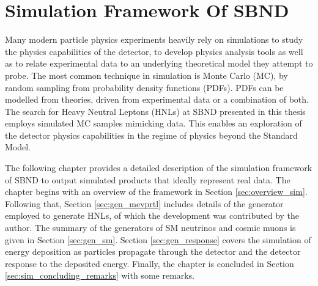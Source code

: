 
\chapter{Simulation Framework Of SBND}
\label{ChapterSim}

\ifpdf
    \graphicspath{{Chapter5/Figs/Raster/}{Chapter5/Figs/PDF/}{Chapter5/Figs/}}
\else
    \graphicspath{{Chapter5/Figs/Vector/}{Chapter5/Figs/}}
\fi


Many modern particle physics experiments heavily rely on simulations to study the physics capabilities of the detector, to develop physics analysis tools as well as to relate experimental data to an underlying theoretical model they attempt to probe.  
The most common technique in simulation is Monte Carlo (MC), by random sampling from probability density functions (PDFs).
PDFs can be modelled from theories, driven from experimental data or a combination of both.
The search for Heavy Neutral Leptons (HNLs) at SBND presented in this thesis employs simulated MC samples mimicking data.                                 
This enables an exploration of the detector physics capabilities in the regime of physics beyond the Standard Model.

The following chapter provides a detailed description of the simulation framework of SBND to output simulated products that ideally represent real data.
The chapter begins with an overview of the framework in Section \ref{sec:overview_sim}.
Following that, Section \ref{sec:gen_mevprtl} includes details of the generator employed to generate HNLs, of which the development was contributed by the author.
The summary of the generators of SM neutrinos and cosmic muons is given in Section \ref{sec:gen_sm}.
Section \ref{sec:gen_response} covers the simulation of energy deposition as particles propagate through the detector and the detector response to the deposited energy.
Finally, the chapter is concluded in Section \ref{sec:sim_concluding_remarks} with some remarks.

